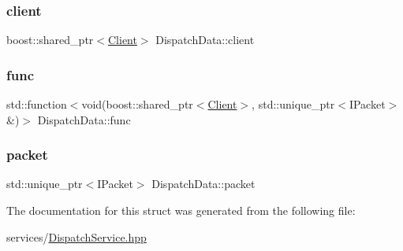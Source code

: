 \subsubsection{\texorpdfstring{client}{client}}
{\footnotesize\ttfamily boost\+::shared\+\_\+ptr$<$\mbox{\hyperlink{classClient}{Client}}$>$ Dispatch\+Data\+::client}

\mbox{\label{structDispatchData_a6672e8f2dfa81cd5b386c1cc96a1c2f6}} 
\subsubsection{\texorpdfstring{func}{func}}
{\footnotesize\ttfamily std\+::function$<$void(boost\+::shared\+\_\+ptr$<$\mbox{\hyperlink{classClient}{Client}}$>$, std\+::unique\+\_\+ptr$<$I\+Packet$>$ \&)$>$ Dispatch\+Data\+::func}

\mbox{\label{structDispatchData_a73c4113d390c2df0b035e7e89ea829b4}} 
\subsubsection{\texorpdfstring{packet}{packet}}
{\footnotesize\ttfamily std\+::unique\+\_\+ptr$<$I\+Packet$>$ Dispatch\+Data\+::packet}



The documentation for this struct was generated from the following file\+:\begin{DoxyCompactItemize}
\item 
services/\mbox{\hyperlink{DispatchService_8hpp}{Dispatch\+Service.\+hpp}}\end{DoxyCompactItemize}
